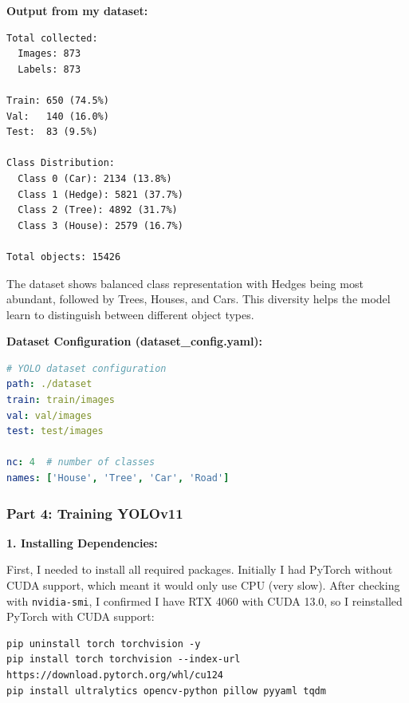 \textbf{Output from my dataset:}
\begin{verbatim}
Total collected:
  Images: 873
  Labels: 873

Train: 650 (74.5%)
Val:   140 (16.0%)
Test:  83 (9.5%)

Class Distribution:
  Class 0 (Car): 2134 (13.8%)
  Class 1 (Hedge): 5821 (37.7%)
  Class 2 (Tree): 4892 (31.7%)
  Class 3 (House): 2579 (16.7%)

Total objects: 15426
\end{verbatim}

The dataset shows balanced class representation with Hedges being most abundant, followed by Trees, Houses, and Cars. This diversity helps the model learn to distinguish between different object types.

\textbf{Dataset Configuration (dataset\_config.yaml):}
\begin{lstlisting}[language=YAML]
# YOLO dataset configuration
path: ./dataset
train: train/images
val: val/images
test: test/images

nc: 4  # number of classes
names: ['House', 'Tree', 'Car', 'Road']
\end{lstlisting}

\subsubsection{Part 4: Training YOLOv11}

\textbf{1. Installing Dependencies:}

First, I needed to install all required packages. Initially I had PyTorch without CUDA support, which meant it would only use CPU (very slow). After checking with \texttt{nvidia-smi}, I confirmed I have RTX 4060 with CUDA 13.0, so I reinstalled PyTorch with CUDA support:

\begin{verbatim}
pip uninstall torch torchvision -y
pip install torch torchvision --index-url https://download.pytorch.org/whl/cu124
pip install ultralytics opencv-python pillow pyyaml tqdm
\end{verbatim}

